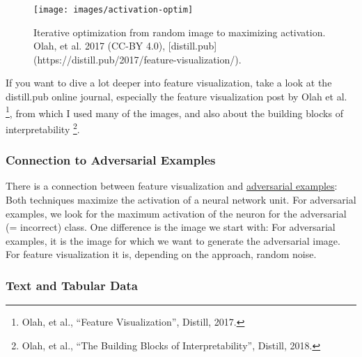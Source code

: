 \documentclass[12pt,]{krantz}
\begin{document}
\begin{figure}

{\centering \texttt{[image: images/activation-optim]} 

}

\caption{Iterative optimization from random image to maximizing activation. Olah, et al. 2017 (CC-BY 4.0), [distill.pub](https://distill.pub/2017/feature-visualization/).}\label{fig:activation-optim}
\end{figure}

If you want to dive a lot deeper into feature visualization, take a look
at the distill.pub online journal, especially the feature visualization
post by Olah et al. \footnote{Olah, et al., ``Feature Visualization'',
  Distill, 2017.}, from which I used many of the images, and also about
the building blocks of interpretability \footnote{Olah, et al., ``The
  Building Blocks of Interpretability'', Distill, 2018.}.

\subsubsection{Connection to Adversarial
Examples}\label{connection-to-adversarial-examples}

There is a connection between feature visualization and
\protect\hyperlink{adversarial}{adversarial examples}: Both techniques
maximize the activation of a neural network unit. For adversarial
examples, we look for the maximum activation of the neuron for the
adversarial (= incorrect) class. One difference is the image we start
with: For adversarial examples, it is the image for which we want to
generate the adversarial image. For feature visualization it is,
depending on the approach, random noise.

\subsubsection{Text and Tabular Data}\label{text-and-tabular-data}
\end{document}
